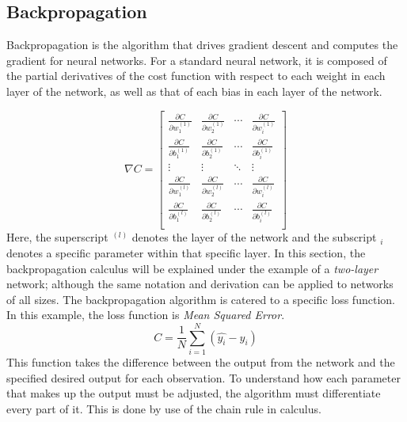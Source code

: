 
\hypertarget{backpropagation}{%
\subsection{Backpropagation}\label{backpropagation}}

Backpropagation is the algorithm that drives gradient descent and computes the gradient for neural networks. For a standard neural network, it is composed of the partial derivatives of the cost function with respect to each weight in each layer of the network, as well as that of each bias in each layer of the network.

\[
\nabla{C} =
\begin{bmatrix}
\frac{\partial{C}}{\partial{w_1^{(1)}}} & \frac{\partial{C}}{\partial{w_2^{(1)}}} & \cdots & 
\frac{\partial{C}}{\partial{w_i^{(1)}}} \\
\frac{\partial{C}}{\partial{b_1^{(1)}}} & \frac{\partial{C}}{\partial{b_2^{(1)}}} & \cdots & 
\frac{\partial{C}}{\partial{b_i^{(1)}}} \\
\vdots & \vdots & \ddots & \vdots \\
\frac{\partial{C}}{\partial{w_1^{(l)}}} & \frac{\partial{C}}{\partial{w_2^{(l)}}} & \cdots & 
\frac{\partial{C}}{\partial{w_i^{(l)}}} \\
\frac{\partial{C}}{\partial{b_1^{(l)}}} & \frac{\partial{C}}{\partial{b_2^{(l)}}} & \cdots & 
\frac{\partial{C}}{\partial{b_i^{(l)}}} \\
\end{bmatrix}
\] Here, the superscript \(^{(l)}\) denotes the layer of the network and
the subscript \(_i\) denotes a specific parameter within that specific
layer. In this section, the backpropagation calculus will be explained under the example of a \textit{two-layer} network; although the same notation and derivation can be applied to networks of all sizes.
The backpropagation algorithm is catered to a specific loss function. In
this example, the loss function is \emph{Mean Squared
Error}.
$$
C = \frac{1}{N} \sum_{i=1}^N (\hat{y_i} - y_i)
$$
This function takes the difference between the output from the
network and the specified desired output for each observation. To
understand how each parameter that makes up the output must be adjusted,
the algorithm must differentiate every part of it. This is done by use
of the chain rule in calculus.

